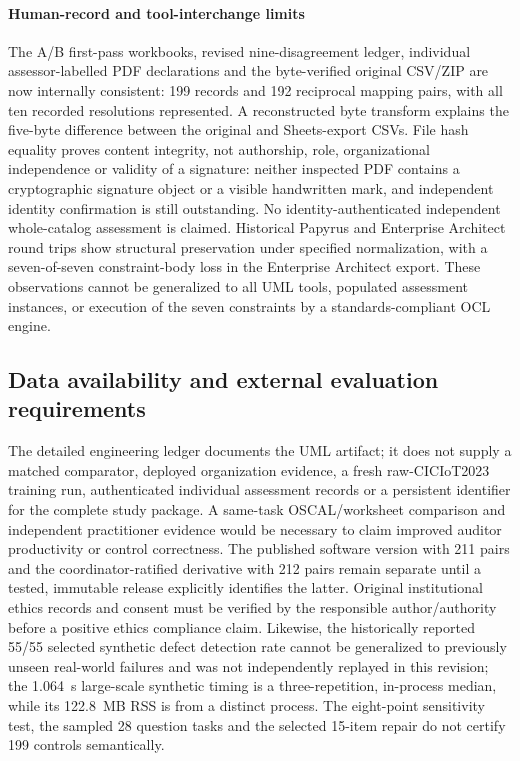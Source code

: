 \documentclass[12pt,a4paper]{article}
\begin{document}
\paragraph{Human-record and tool-interchange limits} The A/B first-pass workbooks, revised nine-disagreement ledger, individual assessor-labelled PDF declarations and the byte-verified original CSV/ZIP are now internally consistent: 199 records and 192 reciprocal mapping pairs, with all ten recorded resolutions represented. A reconstructed byte transform explains the five-byte difference between the original and Sheets-export CSVs. File hash equality proves content integrity, not authorship, role, organizational independence or validity of a signature: neither inspected PDF contains a cryptographic signature object or a visible handwritten mark, and independent identity confirmation is still outstanding. No identity-authenticated independent whole-catalog assessment is claimed. Historical Papyrus and Enterprise Architect round trips show structural preservation under specified normalization, with a seven-of-seven constraint-body loss in the Enterprise Architect export. These observations cannot be generalized to all UML tools, populated assessment instances, or execution of the seven constraints by a standards-compliant OCL engine.


\subsection{Data availability and external evaluation requirements}
\label{sec:stage12-open-gates}
The detailed engineering ledger documents the UML artifact; it does not supply a matched comparator, deployed organization evidence, a fresh raw-CICIoT2023 training run, authenticated individual assessment records or a persistent identifier for the complete study package. A same-task OSCAL/worksheet comparison and independent practitioner evidence would be necessary to claim improved auditor productivity or control correctness. The published software version with 211 pairs and the coordinator-ratified derivative with 212 pairs remain separate until a tested, immutable release explicitly identifies the latter. Original institutional ethics records and consent must be verified by the responsible author/authority before a positive ethics compliance claim. Likewise, the historically reported 55/55 selected synthetic defect detection rate cannot be generalized to previously unseen real-world failures and was not independently replayed in this revision; the 1.064~s large-scale synthetic timing is a three-repetition, in-process median, while its 122.8~MB RSS is from a distinct process. The eight-point sensitivity test, the sampled 28 question tasks and the selected 15-item repair do not certify 199 controls semantically.
\end{document}

